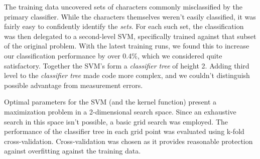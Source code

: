 \documentclass{netsec2012}
\begin{document}
The training data uncovered sets of characters commonly misclassified by the primary classifier. 
While the characters themselves weren't easily classified, it was fairly easy to confidently 
identify the \emph{sets}.  For each such set, the classification was then delegated to a 
second-level SVM, specifically trained against that subset of the original problem.  With the 
latest training runs, we found this to increase our classification performance by over 0.4\%, 
which we considered quite satisfactory. Together the SVM's form a \emph{classifier tree} of 
height 2. Adding third level to the \emph{classifier tree} made code more complex, and we couldn't
distinguish possible advantage from measurement errors.

Optimal parameters for the SVM (and the kernel function) present a maximization problem in a
2-dimensional search space.  Since an exhaustive search in this space isn't possible,
a basic grid search was employed.  The performance of the classifier tree in each grid point
was evaluated using k-fold cross-validation.  Cross-validation was chosen as it provides
reasonable protection against overfitting against the training data.

\end{document}
